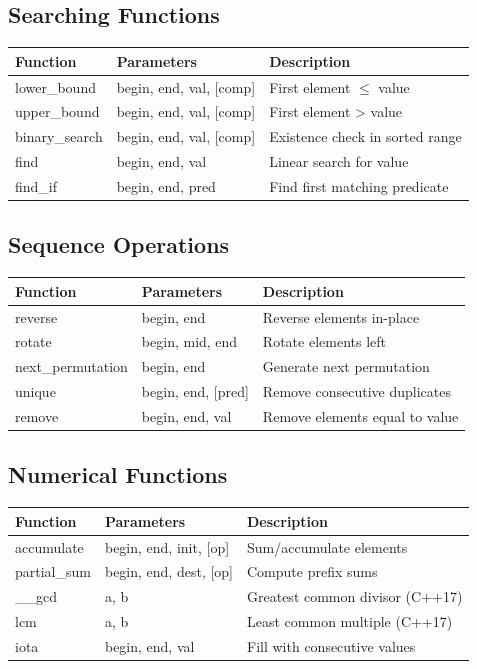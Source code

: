 \documentclass[10pt]{article}
\begin{document}
\begin{multicols*}{2}
\subsection*{Searching Functions}
\begin{tabularx}{\linewidth}{|l|l|X|}
    \hline
    \textbf{Function} & \textbf{Parameters} & \textbf{Description} \\
    \hline
    lower\_bound & begin, end, val, [comp] & First element $\leq$ value \\
    \hline
    upper\_bound & begin, end, val, [comp] & First element > value \\
    \hline
    binary\_search & begin, end, val, [comp] & Existence check in sorted range \\
    \hline
    find & begin, end, val & Linear search for value \\
    \hline
    find\_if & begin, end, pred & Find first matching predicate \\
    \hline
\end{tabularx}

\subsection*{Sequence Operations}
\begin{tabularx}{\linewidth}{|l|l|X|}
    \hline
    \textbf{Function} & \textbf{Parameters} & \textbf{Description} \\
    \hline
    reverse & begin, end & Reverse elements in-place \\
    \hline
    rotate & begin, mid, end & Rotate elements left \\
    \hline
    next\_permutation & begin, end & Generate next permutation \\
    \hline
    unique & begin, end, [pred] & Remove consecutive duplicates \\
    \hline
    remove & begin, end, val & Remove elements equal to value \\
    \hline
\end{tabularx}

\subsection*{Numerical Functions}
\begin{tabularx}{\linewidth}{|l|l|X|}
    \hline
    \textbf{Function} & \textbf{Parameters} & \textbf{Description} \\
    \hline
    accumulate & begin, end, init, [op] & Sum/accumulate elements \\
    \hline
    partial\_sum & begin, end, dest, [op] & Compute prefix sums \\
    \hline
    \_\_gcd & a, b & Greatest common divisor (C++17) \\
    \hline
    lcm & a, b & Least common multiple (C++17) \\
    \hline
    iota & begin, end, val & Fill with consecutive values \\
    \hline
\end{tabularx}


\end{multicols*}
\end{document}
